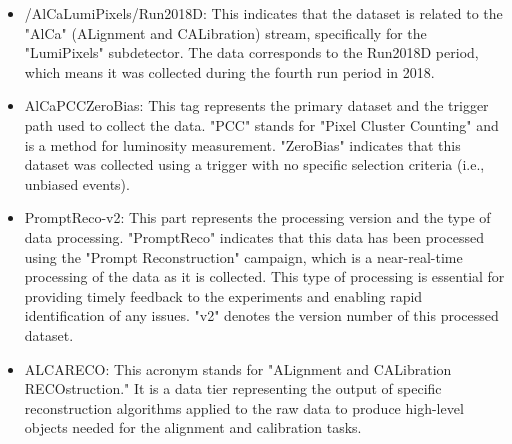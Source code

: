 \begin{itemize}

\item /AlCaLumiPixels/Run2018D:
This indicates that the dataset is related to the "AlCa" (ALignment and CALibration) stream, specifically for the "LumiPixels" subdetector. The data corresponds to the Run2018D period, which means it was collected during the fourth run period in 2018.

\item AlCaPCCZeroBias:
This tag represents the primary dataset and the trigger path used to collect the data. "PCC" stands for "Pixel Cluster Counting" and is a method for luminosity measurement. "ZeroBias" indicates that this dataset was collected using a trigger with no specific selection criteria (i.e., unbiased events).

\item PromptReco-v2:
This part represents the processing version and the type of data processing. "PromptReco" indicates that this data has been processed using the "Prompt Reconstruction" campaign, which is a near-real-time processing of the data as it is collected. This type of processing is essential for providing timely feedback to the experiments and enabling rapid identification of any issues. "v2" denotes the version number of this processed dataset.

\item ALCARECO:
This acronym stands for "ALignment and CALibration RECOstruction." It is a data tier representing the output of specific reconstruction algorithms applied to the raw data to produce high-level objects needed for the alignment and calibration tasks.

\end{itemize}







